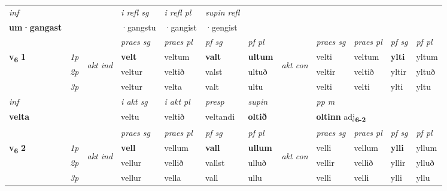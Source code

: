 \begin{longtable}[l]{X>{\footnotesize\itshape}llXXXXlXXXX}
   {\textit{inf}} & &   & \textit{i refl sg} & \textit{i refl pl}   & \textit{supin refl}  \\*
  {\textbf{um\allowbreak ·gangast}} & &   & ·gangstu & ·gangist   & ·gengist  \\*

\midrule

 & &   & \textit{praes sg}  & \textit{praes pl}    & \textit{ pf sg} & \textit{pf pl} & & \textit{praes sg}  & \textit{praes pl}    & \textit{pf sg} & \textit{pf pl }  \\ \cmidrule{4-7} \cmidrule{9-12}
 \multirow{2}{*}{{{\textbf{v{\textsubscript{6}}} \Large{\textbf{1}}}}}  & 1p & \multirow{3}{*}{\begin{turn}{90}\textit{akt ind}\end{turn}} & \textbf{velt} & veltum & \textbf{valt} & \textbf{ultum} & \multirow{3}{*}{\begin{turn}{90}\textit{akt con}\end{turn}} &velti & veltum & \textbf{ylti} & yltum\\*
 & 2p &  &  veltur  & veltið & valst & ultuð & & veltir & veltið & yltir & yltuð \\*
 & 3p &  & veltur & velta & valt & ultu & & velti & velti& ylti & yltu \\*
\cmidrule{4-7} \cmidrule{9-12}

   {\textit{inf}} & &  & \textit{i akt sg} & \textit{i akt pl}   & \textit{presp} & \textit{supin}  && \textit{pp m} \\*
  {\textbf{velta}} & && veltu  & veltið   & veltandi &  \textbf{oltið}  && \multicolumn{2}{l}{\textbf{oltinn} adj\textbf{\textsubscript{6-2}}} \\*

\midrule

 & &   & \textit{praes sg}  & \textit{praes pl}    & \textit{ pf sg} & \textit{pf pl} & & \textit{praes sg}  & \textit{praes pl}    & \textit{pf sg} & \textit{pf pl }  \\ \cmidrule{4-7} \cmidrule{9-12}
 \multirow{2}{*}{{{\textbf{v{\textsubscript{6}}} \Large{\textbf{2}}}}}  & 1p & \multirow{3}{*}{\begin{turn}{90}\textit{akt ind}\end{turn}} & \textbf{vell} & vellum & \textbf{vall} & \textbf{ullum} & \multirow{3}{*}{\begin{turn}{90}\textit{akt con}\end{turn}} &velli & vellum & \textbf{ylli} & yllum\\*
 & 2p &  &  vellur  & vellið & vallst & ulluð & & vellir & vellið & yllir & ylluð \\*
 & 3p &  & vellur & vella & vall & ullu & & velli & velli& ylli & yllu \\*
\cmidrule{4-7} \cmidrule{9-12}


\end{longtable}
